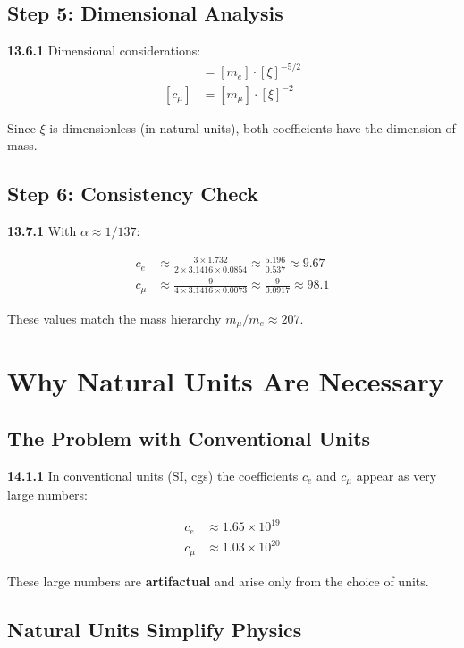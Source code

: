 \subsection{Step 5: Dimensional Analysis}

\noindent \textbf{13.6.1} Dimensional considerations:
\begin{align*}
	[c_e] &= [m_e] \cdot [\xi]^{-5/2} \\
	[c_\mu] &= [m_\mu] \cdot [\xi]^{-2}
\end{align*}

Since $\xi$ is dimensionless (in natural units), both coefficients have the dimension of mass.

\subsection{Step 6: Consistency Check}

\noindent \textbf{13.7.1} With $\alpha \approx 1/137$:

\begin{align*}
	c_e &\approx \frac{3 \times 1.732}{2 \times 3.1416 \times 0.0854} \approx \frac{5.196}{0.537} \approx 9.67 \\
	c_\mu &\approx \frac{9}{4 \times 3.1416 \times 0.0073} \approx \frac{9}{0.0917} \approx 98.1
\end{align*}

These values match the mass hierarchy $m_\mu/m_e \approx 207$.

\section{Why Natural Units Are Necessary}

\subsection{The Problem with Conventional Units}

\noindent \textbf{14.1.1} In conventional units (SI, cgs) the coefficients $c_e$ and $c_\mu$ appear as very large numbers:

\begin{align*}
	c_e &\approx 1.65 \times 10^{19} \\
	c_\mu &\approx 1.03 \times 10^{20}
\end{align*}

These large numbers are \textbf{artifactual} and arise only from the choice of units.

\subsection{Natural Units Simplify Physics}

